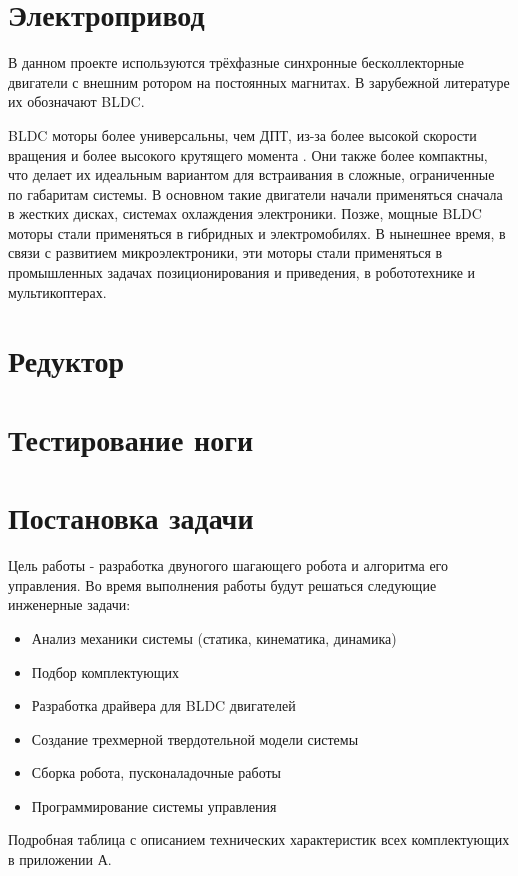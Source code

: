 \section{Электропривод}

В данном проекте используются трёхфазные синхронные бесколлекторные двигатели с внешним ротором на постоянных магнитах. В зарубежной литературе их обозначают BLDC.

BLDC моторы более универсальны, чем ДПТ, из-за более высокой скорости вращения и более высокого крутящего момента \cite{Derammelaere2016}. Они также более компактны, что делает их идеальным вариантом для встраивания в сложные, ограниченные по габаритам системы. В основном такие двигатели начали применяться сначала в жестких дисках, системах охлаждения электроники. Позже, мощные BLDC моторы стали применяться в гибридных и электромобилях. В нынешнее время, в связи с развитием микроэлектроники, эти моторы стали применяться в промышленных задачах позиционирования и приведения, в робототехнике и мультикоптерах.

\section{Редуктор}

\section{Тестирование ноги}

\section{Постановка задачи}

Цель работы - разработка двуногого шагающего робота и алгоритма его управления. Во время выполнения работы будут решаться следующие инженерные задачи:

\begin{itemize}
    \item Анализ механики системы (статика, кинематика, динамика)
    \item Подбор комплектующих
    \item Разработка драйвера для BLDC двигателей
    \item Создание трехмерной твердотельной модели системы
    \item Сборка робота, пусконаладочные работы
    \item Программирование системы управления
\end{itemize}

Подробная таблица с описанием технических характеристик всех комплектующих в приложении А.%